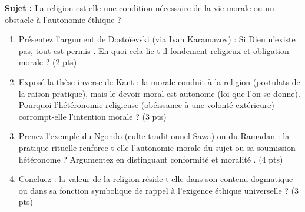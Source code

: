 \documentclass[11pt]{article}
\begin{document}
\begin{exercice}
\textbf{Sujet :} \og La religion est-elle une condition nécessaire de la vie morale ou un obstacle à l'autonomie éthique ? \fg{}

\begin{enumerate}
    \item Présentez l'argument de Dostoïevski (via Ivan Karamazov) : \og Si Dieu n'existe pas, tout est permis \fg{}. En quoi cela lie-t-il fondement religieux et obligation morale ? (2 pts)
    \item Exposé la thèse inverse de Kant : la morale conduit à la religion (postulats de la raison pratique), mais le devoir moral est \og autonome \fg{} (loi que l'on se donne). Pourquoi l'hétéronomie religieuse (obéissance à une volonté extérieure) corrompt-elle l'intention morale ? (3 pts)
    \item Prenez l'exemple du \og Ngondo \fg{} (culte traditionnel Sawa) ou du \og Ramadan \fg{} : la pratique rituelle renforce-t-elle l'autonomie morale du sujet ou sa soumission hétéronome ? Argumentez en distinguant \og conformité \fg{} et \og moralité \fg{}. (4 pts)
    \item Concluez : la \og valeur de la religion \fg{} réside-t-elle dans son contenu dogmatique ou dans sa fonction symbolique de rappel à l'exigence éthique universelle ? (3 pts)
\end{enumerate}
\end{exercice}
\end{document}
